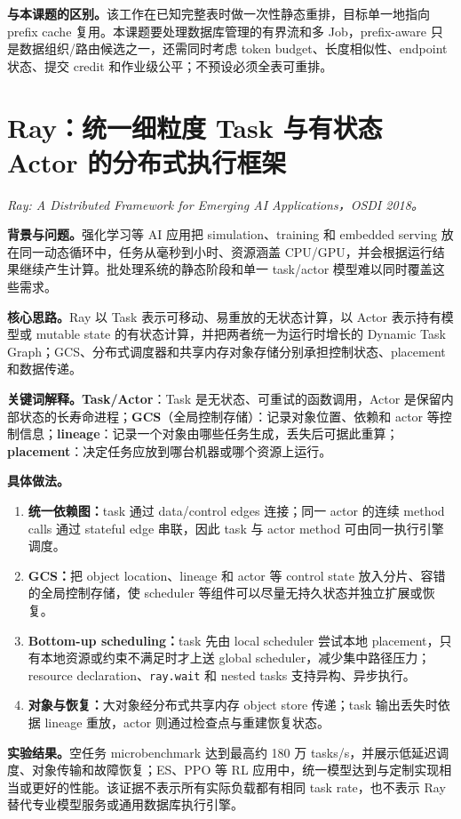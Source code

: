 \documentclass[10pt,a4paper]{ctexart}
\let\digestoriginalsection\section
\renewcommand{\section}{\Needspace{7\baselineskip}\digestoriginalsection}
\newcommand{\paperinfo}[1]{\textit{#1}\par}
\newcommand{\field}[1]{\par\noindent\textbf{#1。}\hspace{0.25em}}
\begin{document}
\field{与本课题的区别}该工作在已知完整表时做一次性静态重排，目标单一地指向 prefix cache 复用。本课题要处理数据库管理的有界流和多 Job，prefix-aware 只是数据组织/路由候选之一，还需同时考虑 token budget、长度相似性、endpoint 状态、提交 credit 和作业级公平；不预设必须全表可重排。

\section{Ray：统一细粒度 Task 与有状态 Actor 的分布式执行框架}
\paperinfo{Ray: A Distributed Framework for Emerging AI Applications，OSDI 2018。}

\field{背景与问题}强化学习等 AI 应用把 simulation、training 和 embedded serving 放在同一动态循环中，任务从毫秒到小时、资源涵盖 CPU/GPU，并会根据运行结果继续产生计算。批处理系统的静态阶段和单一 task/actor 模型难以同时覆盖这些需求。

\field{核心思路}Ray 以 Task 表示可移动、易重放的无状态计算，以 Actor 表示持有模型或 mutable state 的有状态计算，并把两者统一为运行时增长的 Dynamic Task Graph；GCS、分布式调度器和共享内存对象存储分别承担控制状态、placement 和数据传递。

\field{关键词解释}\textbf{Task/Actor}：Task 是无状态、可重试的函数调用，Actor 是保留内部状态的长寿命进程；\textbf{GCS}（全局控制存储）：记录对象位置、依赖和 actor 等控制信息；\textbf{lineage}：记录一个对象由哪些任务生成，丢失后可据此重算；\textbf{placement}：决定任务应放到哪台机器或哪个资源上运行。

\field{具体做法}
\begin{enumerate}
  \item \textbf{统一依赖图：}task 通过 data/control edges 连接；同一 actor 的连续 method calls 通过 stateful edge 串联，因此 task 与 actor method 可由同一执行引擎调度。
  \item \textbf{GCS：}把 object location、lineage 和 actor 等 control state 放入分片、容错的全局控制存储，使 scheduler 等组件可以尽量无持久状态并独立扩展或恢复。
  \item \textbf{Bottom-up scheduling：}task 先由 local scheduler 尝试本地 placement，只有本地资源或约束不满足时才上送 global scheduler，减少集中路径压力；resource declaration、\texttt{ray.wait} 和 nested tasks 支持异构、异步执行。
  \item \textbf{对象与恢复：}大对象经分布式共享内存 object store 传递；task 输出丢失时依据 lineage 重放，actor 则通过检查点与重建恢复状态。
\end{enumerate}

\field{实验结果}空任务 microbenchmark 达到最高约 180 万 tasks/s，并展示低延迟调度、对象传输和故障恢复；ES、PPO 等 RL 应用中，统一模型达到与定制实现相当或更好的性能。该证据不表示所有实际负载都有相同 task rate，也不表示 Ray 替代专业模型服务或通用数据库执行引擎。
\end{document}
